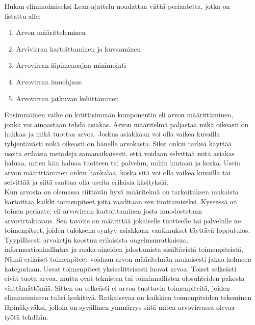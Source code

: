 \documentclass[finnish,12pt,a4paper,pdftex]{article}
\begin{document}
Hukan eliminoimiseksi Lean-ajattelu noudattaa viittä periaatetta, jotka on listattu alle:

\begin{enumerate}
\setlength{\itemsep}{0pt}
    \item Arvon määritteleminen
    \item Arvivirran kartoittaminen ja kuvaaminen
    \item Arvovirran läpimenoajan minimointi
    \item Arvovirran imuohjaus
    \item Arvovirran jatkuvan kehittäminen
\end{enumerate}

 Ensimmäinen vaihe on kriittisimmän komponentin eli arvon määrittäminen, jonka voi ainoastaan tehdä asiakas. Arvon määritelmä paljastaa mikä oikeasti on hukkaa ja mikä tuottaa arvoa. Joskus asiakkaan voi olla vaikea kuvailla tyhjentävästi mikä oikeasti on hänelle arvokasta. Siksi onkin tärkeä käyttää useita erilaisia metodeja samanaikaisesti, että voidaan selvittää mitä asiakas haluaa, miten hän haluaa tuotteen tai palvelun, mihin hintaan ja koska. Usein arvon määrittäminen onkin hankalaa, koska sitä voi olla vaikea kuvailla tai selvittää ja siitä saattaa olla useita erilaisia käsityksiä. \\

Kun arvosta on olemassa riittävän hyvä määritelmä on tarkoituksen mukaista kartoittaa kaikki toimenpiteet joita vaaditaan sen tuottamiseksi. Kyseessä on toinen periaate, eli arvovirran kartoittaminen josta muodostetaan arvovirtakuvaus. Sen tavoite on määrittää jokaiselle tuotteelle tai palvelulle ne toimenpiteet, joiden tuloksena syntyy asiakkaan vaatimukset täyttävä lopputulos. Tyypillisesti arvoketju koostuu erilaisista ongelmanratkaisua, informaationhallintaa ja raaka-aineiden jalostamista sisältävistä toimenpiteistä. Nämä erilaiset toimenpiteet voidaan arvon määritelmän mukaisesti jakaa kolmeen kategoriaan. Useat toimenpiteet yksiselitteisesti luovat arvoa. Toiset selkeästi eivät tuota arvoa, mutta ovat teknisten tai toiminnallisten olosuhteiden pakosta välttämättömiä. Sitten on selkeästi ei arvoa tuottavia toimenpiteitä, joiden eliminoimiseen tulisi keskittyä. Ratkaisevaa on kaikkien toimenpiteiden tekeminen läpinäkyväksi, jolloin on syvällinen ymmärrys siitä miten arvovirrassa olevaa työtä tehdään.\\
\end{document}

